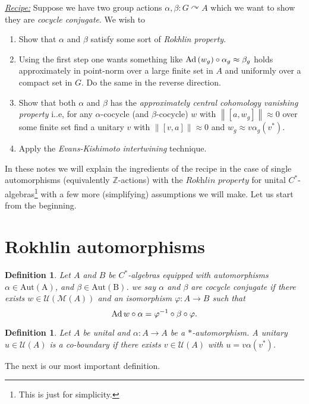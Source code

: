\documentclass[11pt,a4paper,oneside]{amsart}
\newtheorem{definition}[theorem]{Definition}
\newcommand{\Ad}{{\rm Ad\,}}
\newcommand{\norm}[1]{\left\|#1\right\|} %
\newcommand{\acts}{\curvearrowright}
\begin{document}
\begin{tcolorbox}[width=17cm, colframe=black, colback=SkyBlue! 20, halign=left]
\underline{\textit{Recipe:}} Suppose we have two group actions $\alpha, \beta: G\acts A$ which we want to show they are \textit{cocycle conjugate}. We wish to \begin{enumerate}
\item Show that $\alpha$ and $\beta$ satisfy some sort of \textit{Rokhlin property}. 
\item Using the first step one wants something like $\Ad(w_g)\circ \alpha_g \approx \beta_g$ holds approximately in point-norm over a large finite set in $A$ and uniformly over a compact set in $G$. Do the same in the reverse direction. 
\item Show that both $\alpha$ and $\beta$ has the \textit{approximately central cohomology vanishing property} i..e, for any $\alpha$-cocycle (and $\beta$-cocycle) $w$ with $\norm {[a,w_g]}\approx 0$ over some finite set find a unitary $v$ with $\norm{[v,a]}\approx 0$ and $w_g\approx v\alpha_g(v^*)$. 
\item Apply the \textit{Evans-Kishimoto intertwining} technique. 
\end{enumerate}
\end{tcolorbox}

In these notes we will explain the ingredients of the recipe in the case of single automorphisms (equivalently $\mathbb Z$-actions) with the $\textit{Rokhlin property}$  for unital $C^*$-algebras\footnote{This is just for simplicity.} with a few more (simplifying) assumptions we will make. Let us start from the beginning. 

\section{Rokhlin automorphisms}

\begin{tcolorbox}[colback= LimeGreen! 50]
\begin{definition}
Let $A$ and $B$ be $C^*$-algebras equipped with automorphisms $\alpha\in \mathrm{Aut(A)}$, and $\beta\in \mathrm{Aut(B)}$. we say $\alpha$ and $\beta$ are cocycle conjugate if there exists $w\in \mathcal U(\mathcal M(A))$ and an isomorphism $\varphi: A\rightarrow B$ such that $$\Ad w\circ \alpha= \varphi^{-1}\circ \beta \circ \varphi.$$ 
\end{definition}
\end{tcolorbox}

\begin{tcolorbox}[colback= LimeGreen! 50]
\begin{definition}
Let $A$ be unital and $\alpha: A\rightarrow A$ be a $*$-automorphism. A unitary $u\in \mathcal U(A)$ is a co-boundary if there exists $v\in \mathcal U(A)$ with $u=v\alpha(v^*)$. 
\end{definition} 
\end{tcolorbox}
The next is our most important definition. 
\end{document}
